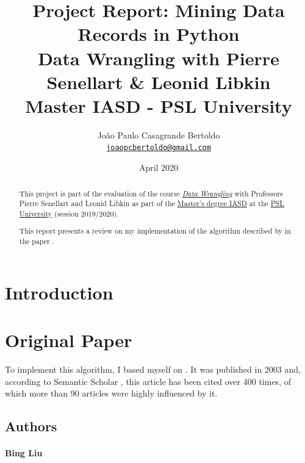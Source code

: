 \documentclass[10pt]{article}
\title{
    \huge Project Report: Mining Data Records in Python \\ 
    \medskip
    \large Data Wrangling with Pierre Senellart \& Leonid Libkin  \\
    Master IASD - PSL University
}
\author{
    João Paulo Casagrande Bertoldo \\
    \href{mailto:joaopcbertoldo@gmail.com}{\texttt{joaopcbertoldo@gmail.com}} 
}
\date{April 2020}
\begin{document}




{
    \maketitle

    \begin{abstract}
    
    This project is part of the evaluation of the course \href{https://moodle.di.ens.fr/enrol/index.php?id=14}{\textit{Data Wrangling}} with Professors Pierre Senellart and Leonid Libkin as part of the \href{https://www.lamsade.dauphine.fr/wp/iasd/en/}{Master's degree IASD} at the \href{https://www.psl.eu/en}{PSL University} (session 2019/2020).
    \medskip
    
    This report presents a review on my implementation of the algorithm described by \cite{mdr} in the paper . 

    \end{abstract}
}

\tableofcontents
\newpage


\section{Introduction}

\section{Original Paper}

To implement this algorithm, I based myself on \cite{mdr-technical}. It was published in 2003 and, according to Semantic Scholar \citep{mdr-semantic-scholar}, this article has been cited over 400 times, of which more than 90 articles were highly influenced by it.

\subsection{Authors}

\paragraph{Bing Liu}
\end{document}
